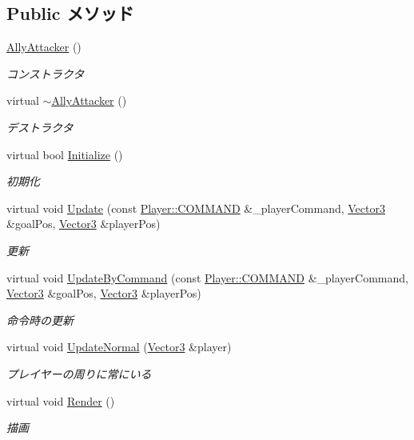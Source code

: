 \subsection*{Public メソッド}
\begin{DoxyCompactItemize}
\item 
\hyperlink{class_ally_attacker_affedf81dbacf0834cb9f5d75f15a654e}{Ally\-Attacker} ()
\begin{DoxyCompactList}\small\item\em コンストラクタ \end{DoxyCompactList}\item 
virtual \hyperlink{class_ally_attacker_ad1fec0e10500869c7f0a389da51d1405}{$\sim$\-Ally\-Attacker} ()
\begin{DoxyCompactList}\small\item\em デストラクタ \end{DoxyCompactList}\item 
virtual bool \hyperlink{class_ally_attacker_aef6541e9fd1b90556476c95278e46bc7}{Initialize} ()
\begin{DoxyCompactList}\small\item\em 初期化 \end{DoxyCompactList}\item 
virtual void \hyperlink{class_ally_attacker_afcbfead763853ab568897f02f5747425}{Update} (const \hyperlink{class_player_a70057174eaea9fd441ca86cc7bb896ed}{Player\-::\-C\-O\-M\-M\-A\-N\-D} \&\-\_\-player\-Command, \hyperlink{struct_vector3}{Vector3} \&goal\-Pos, \hyperlink{struct_vector3}{Vector3} \&player\-Pos)
\begin{DoxyCompactList}\small\item\em 更新 \end{DoxyCompactList}\item 
virtual void \hyperlink{class_ally_attacker_a22a8f9299878e8e74491701fa1416d2e}{Update\-By\-Command} (const \hyperlink{class_player_a70057174eaea9fd441ca86cc7bb896ed}{Player\-::\-C\-O\-M\-M\-A\-N\-D} \&\-\_\-player\-Command, \hyperlink{struct_vector3}{Vector3} \&goal\-Pos, \hyperlink{struct_vector3}{Vector3} \&player\-Pos)
\begin{DoxyCompactList}\small\item\em 命令時の更新 \end{DoxyCompactList}\item 
virtual void \hyperlink{class_ally_attacker_a9910a2a200f19c08cecaf978ed9f3b01}{Update\-Normal} (\hyperlink{struct_vector3}{Vector3} \&player)
\begin{DoxyCompactList}\small\item\em プレイヤーの周りに常にいる \end{DoxyCompactList}\item 
virtual void \hyperlink{class_ally_attacker_a9aee0fd5bee4906a85627bc2f87e76a4}{Render} ()
\begin{DoxyCompactList}\small\item\em 描画 \end{DoxyCompactList}\end{DoxyCompactItemize}

